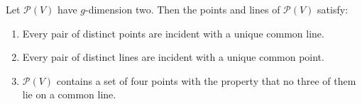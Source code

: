 Let $\mathcal{P}(V)$ have $g$-dimension two. Then the points and lines of $\mathcal{P}(V)$ satisfy:

\begin{enumerate}
\item[(i)] Every pair of distinct points are incident with a unique common line.
\item[(ii)] Every pair of distinct lines are incident with a unique common point.
\item[(iii)] $\mathcal{P}(V)$ contains a set of four points with the property that no three of them lie on a common line.
\end{enumerate}
